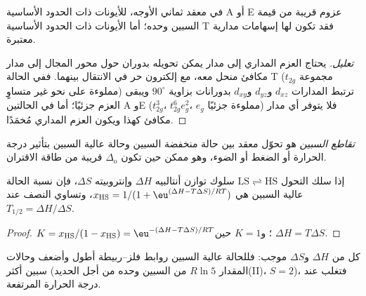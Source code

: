 \begin{proposition}\label{prop:b3:complex-spectra-magnetism:orbital-contribution}
في معقد ثماني الأوجه، للأيونات ذات الحدود الأساسية A أو E عزوم قريبة من
قيمة السبين وحده؛ أما الأيونات ذات الحدود الأساسية T فقد تكون لها إسهامات مدارية
معتبرة.
\end{proposition}

\begin{proof}[تعليل]
يحتاج العزم المداري إلى مدار يمكن تحويله بدوران حول محور المجال إلى مدار مكافئ
منحل معه، مع إلكترون حر في
الانتقال بينهما. ففي الحالة T (مجموعة $t_{2g}$ مملوءة على نحو غير متساوٍ) ترتبط المدارات $d_{xz}$ و$d_{yz}$ و$d_{xy}$
بدورانات بزاوية $90^\circ$ ويبقى العزم جزئيًا؛ أما في الحالتين A وE
($t_{2g}^3$، $t_{2g}^6e_g^2$، $e_g$ مملوءة جزئيًا) فلا يتوفر أي مدار مكافئ كهذا ويكون
العزم المداري مُخمَدًا.
\end{proof}

\begin{definition}\label{def:b3:complex-spectra-magnetism:spin-crossover}
\emph{تقاطع السبين} هو تحوّل معقد بين
حالة منخفضة السبين وحالة عالية السبين بتأثير درجة الحرارة أو الضغط أو الضوء، وهو ممكن
حين تكون $\Delta_{\mathrm o}$ قريبة من طاقة الاقتران.
\end{definition}

\begin{proposition}\label{prop:b3:complex-spectra-magnetism:crossover}
إذا سلك التحول $\mathrm{LS} \rightleftharpoons \mathrm{HS}$ سلوك توازن أنتالبيه $\Delta H$ وإنتروبيته $\Delta S$، فإن
نسبة الحالة عالية السبين هي $x_{\mathrm{HS}} = 1/(1 + \eu^{(\Delta H - T\Delta S)/RT})$، وتساوي النصف عند $T_{1/2} = \Delta H/\Delta S$.
\end{proposition}

\begin{proof}
$K = x_{\mathrm{HS}}/(1 - x_{\mathrm{HS}}) = \eu^{-(\Delta H - T\Delta S)/RT}$؛ و$K = 1$ حين $\Delta H = T\Delta S$.
\end{proof}

كل من $\Delta H$ و$\Delta S$ موجب: فللحالة عالية السبين روابط فلز--ربيطة أطول وأضعف
وحالات سبين أكثر (المقدار $R\ln5$ من السبين وحده من أجل الحديد(II)، $S = 2$)، فتغلب عند
درجة الحرارة المرتفعة.

